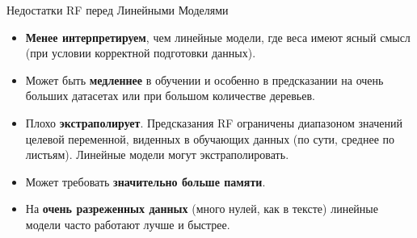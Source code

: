 \begin{myblock}{Недостатки RF перед Линейными Моделями}
    \begin{itemize}[nosep, leftmargin=*]
        \item \textbf{Менее интерпретируем}, чем линейные модели, где веса имеют ясный смысл (при условии корректной подготовки данных).
        \item Может быть \textbf{медленнее} в обучении и особенно в предсказании на очень больших датасетах или при большом количестве деревьев.
        \item Плохо \textbf{экстраполирует}. Предсказания RF ограничены диапазоном значений целевой переменной, виденных в обучающих данных (по сути, среднее по листьям). Линейные модели могут экстраполировать.
        \item Может требовать \textbf{значительно больше памяти}.
        \item На \textbf{очень разреженных данных} (много нулей, как в тексте) линейные модели часто работают лучше и быстрее.
    \end{itemize}
\end{myblock}

